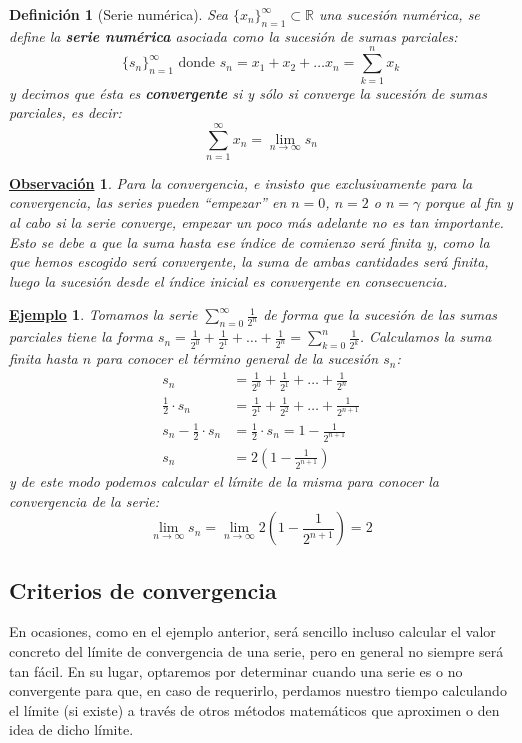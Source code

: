 \documentclass[10pt,a4paper,openright]{book}
\theoremstyle{break}
\newtheorem{defi}{Definición}[chapter]
\newtheorem{obs}{\underline{Observación}}[chapter]
\newtheorem{ej}{\underline{Ejemplo}}[chapter]
\begin{document}
\begin{defi}[Serie numérica]
Sea $\{x_n\}_{n=1}^\infty\subset \mathbb R$ una sucesión numérica, se define la \textbf{serie numérica} asociada como la sucesión de sumas parciales:
\[
\{s_n\}_{n=1}^\infty \mbox{ donde } s_n = x_1 + x_2 + \ldots x_n = \sum_{k=1}^{n} x_k
\]
y decimos que ésta es \textbf{convergente} si y sólo si converge la sucesión de sumas parciales, es decir:
$$\sum_{n=1}^\infty x_n = \lim_{n\rightarrow\infty} s_n$$
\end{defi}

\begin{obs}
Para la convergencia, e insisto que exclusivamente para la convergencia, las series pueden ``empezar'' en $n=0$, $n=2$ o $n=\gamma$ porque al fin y al cabo si la serie converge, empezar un poco más adelante no es tan importante. Esto se debe a que la suma hasta ese índice de comienzo será finita y, como la que hemos escogido será convergente, la suma de ambas cantidades será finita, luego la sucesión desde el índice inicial es convergente en consecuencia.
\end{obs}

\begin{ej}
Tomamos la serie $ \displaystyle \sum_{n=0}^{\infty} \frac{1}{2^n}$ de forma que la sucesión de las sumas parciales tiene la forma $s_n =\frac{1}{2^0} + \frac{1}{2^1} + \ldots + \frac{1}{2^n} = \sum_{k=0}^{n} \frac{1}{2^k}$. Calculamos la suma finita hasta $n$ para conocer el término general de la sucesión $s_n$:
\begin{align*}
s_n &= \frac{1}{2^0} + \frac{1}{2^1} + \ldots + \frac{1}{2^n} \\
\frac{1}{2}\cdot s_n &= \frac{1}{2^1} + \frac{1}{2^2} + \ldots + \frac{1}{2^{n+1}} \\
s_n - \frac{1}{2}\cdot s_n &= \frac{1}{2}\cdot s_n = 1 - \frac{1}{2^{n+1}} \\
s_n &= 2\left(1 - \frac{1}{2^{n+1}}\right)
\end{align*}
y de este modo podemos calcular el límite de la misma para conocer la convergencia de la serie:
\[
\lim_{n \to \infty} s_n = \lim_{n \to \infty}  2\left(1 - \frac{1}{2^{n+1}}\right) = 2
\]
\end{ej}

\subsection{Criterios de convergencia}
En ocasiones, como en el ejemplo anterior, será sencillo incluso calcular el valor concreto del límite de convergencia de una serie, pero en general no siempre será tan fácil. En su lugar, optaremos por determinar cuando una serie es o no convergente para que, en caso de requerirlo, perdamos nuestro tiempo calculando el límite (si existe) a través de otros métodos matemáticos que aproximen o den idea de dicho límite.
\end{document}
